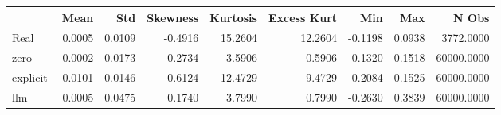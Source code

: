 \begin{tabular}{lrrrrrrrr}
\toprule
 & Mean & Std & Skewness & Kurtosis & Excess Kurt & Min & Max & N Obs \\
\midrule
Real & 0.0005 & 0.0109 & -0.4916 & 15.2604 & 12.2604 & -0.1198 & 0.0938 & 3772.0000 \\
zero & 0.0002 & 0.0173 & -0.2734 & 3.5906 & 0.5906 & -0.1320 & 0.1518 & 60000.0000 \\
explicit & -0.0101 & 0.0146 & -0.6124 & 12.4729 & 9.4729 & -0.2084 & 0.1525 & 60000.0000 \\
llm & 0.0005 & 0.0475 & 0.1740 & 3.7990 & 0.7990 & -0.2630 & 0.3839 & 60000.0000 \\
\bottomrule
\end{tabular}

